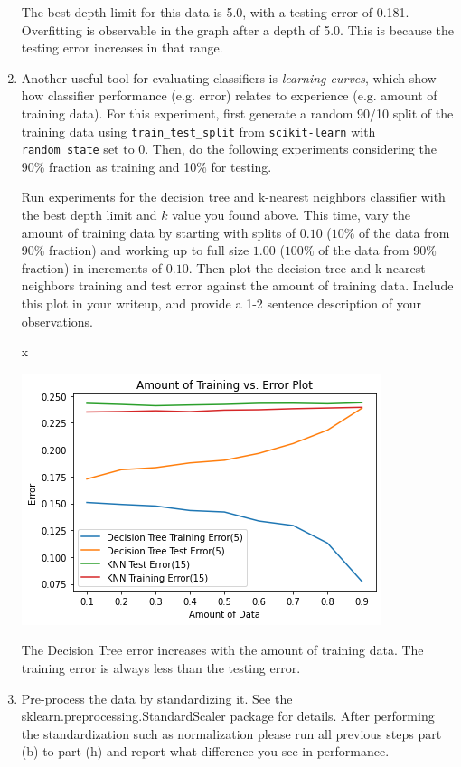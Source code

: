 \begin{enumerate}[resume]
The best depth limit for this data is 5.0, with a testing error of 0.181. Overfitting is observable in the graph after a depth of 5.0. This is because the testing error increases in that range.

\item {} Another useful tool for evaluating classifiers is \emph{learning curves}, which show how classifier performance (e.g. error) relates to experience (e.g. amount of training data).
For this experiment, first generate a random 90/10 split of the training data using \verb|train_test_split| from \verb|scikit-learn| with \verb|random_state| set to 0. Then, do the following experiments considering the 90\% fraction as training and 10\% for testing. 

Run experiments for the decision tree and k-nearest neighbors classifier with the best depth limit and $k$ value you found above.
This time, vary the amount of training data by starting with splits of $0.10$ ($10\%$ of the data from 90\% fraction) and working up to full size $1.00$ ($100\%$ of the data from 90\% fraction) in increments of $0.10$. Then plot the decision tree and k-nearest neighbors training and test error against the amount of training data. 
Include this plot in your writeup, and provide a 1-2 sentence description of your observations.

\sol x 

\begin{center}
    \includegraphics[scale=0.6]{5h.png} \\
\end{center}

The Decision Tree error increases with the amount of training data. The training error is always less than the testing error.

\item {} Pre-process the data by standardizing it. See the sklearn.preprocessing.StandardScaler package for details. After performing the standardization such as normalization please run all previous steps part (b) to part (h) and report what difference you see in performance.   \\


\end{enumerate}
